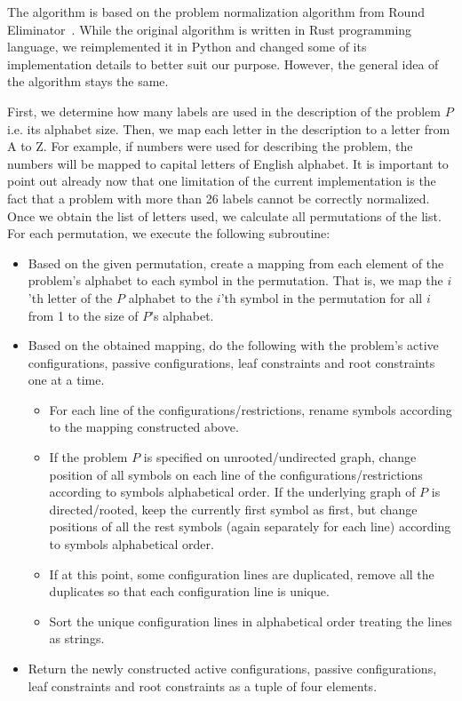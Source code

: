 The algorithm is based on the problem normalization algorithm
from Round Eliminator~\cite{Olivetti2020}. While the original
algorithm is written in Rust programming language, we
reimplemented it in Python and changed some of its
implementation details to better suit our purpose.
However, the general idea of the algorithm stays the same.

First, we determine how many labels are used in the description of the
problem $P$ i.e. its alphabet size. Then, we map each letter in the description
to a letter from A to Z. For example, if numbers were used for describing
the problem, the numbers will be mapped to capital letters of
English alphabet. It is important to point out already now that
one limitation of the current implementation is the fact that
a problem with more than 26 labels cannot be correctly normalized.
Once we obtain the list of letters used, we calculate all
permutations of the list. For each permutation, we execute the following
subroutine:

\begin{itemize}
  \item Based on the given permutation, create a mapping from each
  element of the problem's alphabet to each symbol in the permutation.
  That is, we map the $i$'th letter of the $P$ alphabet to the $i$'th symbol
  in the permutation for all $i$ from 1 to the size of $P$'s alphabet.
  \item Based on the obtained mapping, do the following with the problem's
  active configurations, passive configurations, leaf constraints and
  root constraints one at a time.
  
  \begin{itemize}
    \item For each line of the configurations/restrictions, rename symbols
    according to the mapping constructed above.
    \item If the problem $P$ is specified on unrooted/undirected graph,
    change position of all symbols on each line of the configurations/restrictions according to symbols alphabetical order.
    If the underlying graph of $P$ is directed/rooted, keep the currently first
    symbol as first, but change positions of all the rest symbols (again separately for each line)
    according to symbols alphabetical order.
    \item If at this point, some configuration lines are
    duplicated, remove all the duplicates so that each configuration
    line is unique.
    \item Sort the unique configuration lines in alphabetical order
    treating the lines as strings.
  \end{itemize}

  \item Return the newly constructed active configurations,
  passive configurations, leaf constraints and root constraints as
  a tuple of four elements.
\end{itemize}

